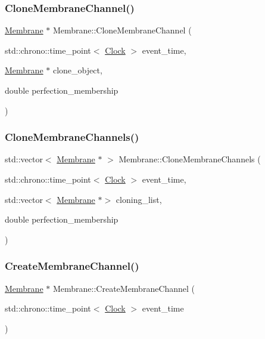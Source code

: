 \subsubsection{\texorpdfstring{Clone\+Membrane\+Channel()}{CloneMembraneChannel()}}
{\footnotesize\ttfamily \mbox{\hyperlink{classMembrane}{Membrane}} $\ast$ Membrane\+::\+Clone\+Membrane\+Channel (\begin{DoxyParamCaption}\item[{std\+::chrono\+::time\+\_\+point$<$ \mbox{\hyperlink{universe_8h_a0ef8d951d1ca5ab3cfaf7ab4c7a6fd80}{Clock}} $>$}]{event\+\_\+time,  }\item[{\mbox{\hyperlink{classMembrane}{Membrane}} $\ast$}]{clone\+\_\+object,  }\item[{double}]{perfection\+\_\+membership }\end{DoxyParamCaption})}

\mbox{\label{classMembrane_aa9958ea461092c0d2aceb07c9c34373c}} 
\subsubsection{\texorpdfstring{Clone\+Membrane\+Channels()}{CloneMembraneChannels()}}
{\footnotesize\ttfamily std\+::vector$<$ \mbox{\hyperlink{classMembrane}{Membrane}} $\ast$ $>$ Membrane\+::\+Clone\+Membrane\+Channels (\begin{DoxyParamCaption}\item[{std\+::chrono\+::time\+\_\+point$<$ \mbox{\hyperlink{universe_8h_a0ef8d951d1ca5ab3cfaf7ab4c7a6fd80}{Clock}} $>$}]{event\+\_\+time,  }\item[{std\+::vector$<$ \mbox{\hyperlink{classMembrane}{Membrane}} $\ast$$>$}]{cloning\+\_\+list,  }\item[{double}]{perfection\+\_\+membership }\end{DoxyParamCaption})}

\mbox{\label{classMembrane_a589b56529ac634a52b2a5fc78d356973}} 
\subsubsection{\texorpdfstring{Create\+Membrane\+Channel()}{CreateMembraneChannel()}}
{\footnotesize\ttfamily \mbox{\hyperlink{classMembrane}{Membrane}} $\ast$ Membrane\+::\+Create\+Membrane\+Channel (\begin{DoxyParamCaption}\item[{std\+::chrono\+::time\+\_\+point$<$ \mbox{\hyperlink{universe_8h_a0ef8d951d1ca5ab3cfaf7ab4c7a6fd80}{Clock}} $>$}]{event\+\_\+time }\end{DoxyParamCaption})}

